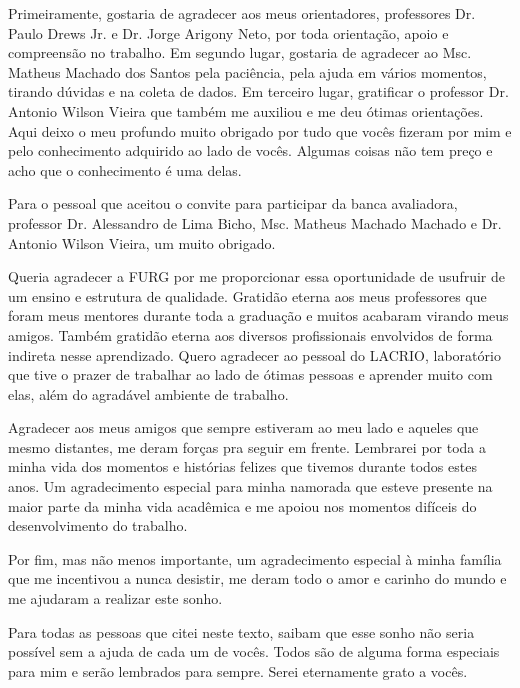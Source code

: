 
\begin{agradecimentos}[AGRADECIMENTOS]

Primeiramente, gostaria de agradecer aos meus orientadores, professores Dr. Paulo Drews Jr. e Dr. Jorge Arigony Neto, por toda orientação, apoio e compreensão no trabalho. 
Em segundo lugar, gostaria de agradecer ao Msc. Matheus Machado dos Santos pela paciência, pela ajuda em vários momentos, tirando dúvidas e na coleta de dados. 
Em terceiro lugar, gratificar o professor Dr. Antonio Wilson Vieira que também me auxiliou e me deu ótimas orientações. 
Aqui deixo o meu profundo muito obrigado por tudo que vocês fizeram por mim e pelo conhecimento adquirido ao lado de vocês.
Algumas coisas não tem preço e acho que o conhecimento é uma delas.

Para o pessoal que aceitou o convite para participar da banca avaliadora, professor Dr. Alessandro de Lima Bicho, Msc. Matheus Machado Machado e Dr. Antonio Wilson Vieira, um muito obrigado. 

Queria agradecer a FURG por me proporcionar essa oportunidade de usufruir de um ensino e estrutura de qualidade.
Gratidão eterna aos meus professores que foram meus mentores durante toda a graduação e muitos acabaram virando meus amigos.
Também gratidão eterna aos diversos profissionais envolvidos de forma indireta nesse aprendizado. 
Quero agradecer ao pessoal do LACRIO, laboratório que tive o prazer de trabalhar ao lado de ótimas pessoas e aprender muito com elas, além do agradável ambiente de trabalho. 

Agradecer aos meus amigos que sempre estiveram ao meu lado e aqueles que mesmo distantes, me deram forças pra seguir em frente.
Lembrarei por toda a minha vida dos momentos e histórias felizes que tivemos durante todos estes anos.
Um agradecimento especial para minha namorada que esteve presente na maior parte da minha vida acadêmica e me apoiou nos momentos difíceis do desenvolvimento do trabalho.

Por fim, mas não menos importante, um agradecimento especial à minha família que me incentivou a nunca desistir, me deram todo o amor e carinho do mundo e me ajudaram a realizar este sonho.

Para todas as pessoas que citei neste texto, saibam que esse sonho não seria possível sem a ajuda de cada um de vocês. Todos são de alguma forma especiais para mim e serão lembrados para sempre. Serei eternamente grato a vocês.


\end{agradecimentos}
